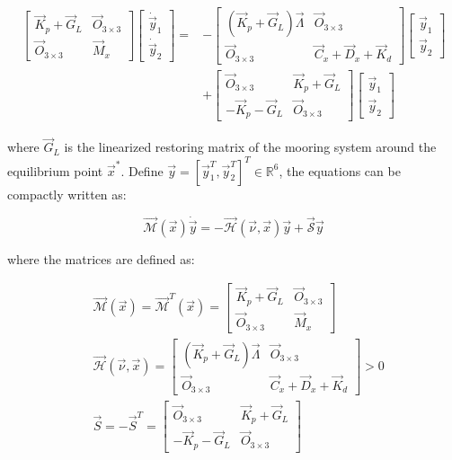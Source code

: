 \begin{sloppypar}
\begin{equation}
\begin{aligned}
\begin{bmatrix}
\vec{K}_p + \vec{G}_L & \vec{O}_{3\times3} \\
\vec{O}_{3\times3} & \vec{M}_x
\end{bmatrix} \begin{bmatrix}
\dot{\vec{y}}_1 \\
\dot{\vec{y}}_2
\end{bmatrix} = &-\begin{bmatrix}
(\vec{K}_p + \vec{G}_L)\vec{\Lambda} & \vec{O}_{3\times3} \\
\vec{O}_{3\times3} & \vec{C}_x + \vec{D}_x + \vec{K}_d
\end{bmatrix} \begin{bmatrix}
\vec{y}_1 \\
\vec{y}_2
\end{bmatrix} \\
&+ \begin{bmatrix}
\vec{O}_{3\times3} & \vec{K}_p + \vec{G}_L  \\
-\vec{K}_p - \vec{G}_L  & \vec{O}_{3\times3}
\end{bmatrix} \begin{bmatrix}
\vec{y}_1 \\
\vec{y}_2
\end{bmatrix}
\end{aligned}
\end{equation}

\noindent where $\vec{G}_L$ is the linearized restoring matrix of the mooring system around the equilibrium point $\vec{x}^*$. Define $\vec{y} = [\vec{y}_1^T, \vec{y}_2^T]^T\in\mathbb{R}^6$, the equations can be compactly written as:

\begin{equation}
\vec{\mathcal{M}}(\vec{x})\dot{\vec{y}} = -\vec{\mathcal{H}}(\vec{\nu}, \vec{x})\vec{y} + \vec{\mathcal{S}}\vec{y} 
\end{equation}

\noindent where the matrices are defined as:

\begin{align}
&\vec{\mathcal{M}}(\vec{x}) = \vec{\mathcal{M}}^T(\vec{x}) = \begin{bmatrix}
\vec{K}_p + \vec{G}_L & \vec{O}_{3\times3} \\
\vec{O}_{3\times3} & \vec{M}_x
\end{bmatrix} \\
&\vec{\mathcal{H}}(\vec{\nu}, \vec{x}) = \begin{bmatrix}
(\vec{K}_p + \vec{G}_L)\vec{\Lambda} & \vec{O}_{3\times3} \\
\vec{O}_{3\times3} & \vec{C}_x + \vec{D}_x + \vec{K}_d
\end{bmatrix} > 0 \\
&\vec{S} = -\vec{S}^T = \begin{bmatrix}
\vec{O}_{3\times3} & \vec{K}_p + \vec{G}_L  \\
-\vec{K}_p - \vec{G}_L  & \vec{O}_{3\times3}
\end{bmatrix}
\end{align}


\end{sloppypar}
